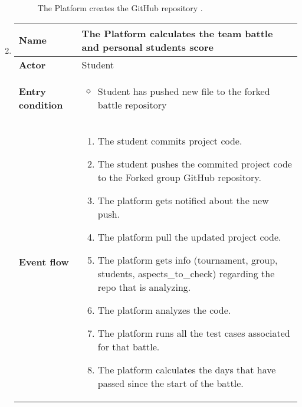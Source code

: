 \begin{enumerate}[label=\textbf{UC\arabic*}:,leftmargin=1.3cm]
          \begin{figure}[H]
              \centering
              \caption{The Platform creates the GitHub repository   .}
              \label{fig:Subscribe to tournament from notification}
          \end{figure}
          \pagebreak
    \item \textbf{}
          \begin{table}[H]
              \centering
              \begin{tabular}{|l|p{11.9cm}|}
                  \hline
                  \textbf{Name}            & The Platform calculates the team battle and personal students score                    \\\hline
                  \textbf{Actor}           & Student                                                                               \\\hline
                  \textbf{Entry condition} &
                  \begin{itemize}
                      \item Student has pushed new file to the forked battle repository
                  \end{itemize}                                                \\\hline
                  \textbf{Event flow}      &
                  \begin{enumerate}[label=\arabic*.]
                      \item The student commits project code.
                      \item The student pushes the commited project code to the Forked group GitHub repository.
                      \item The platform gets notified about the new push.
                      \item The platform pull the updated project code.
                      \item The platform gets info (tournament, group, students, aspects_to_check) regarding the repo that is analyzing.
                      \item The platform analyzes the code.
                      \item The platform runs all the test cases associated for that battle.
                      \item The platform calculates the days that have passed since the start of the battle.

\end{enumerate}
\end{tabular}
\end{table}
\end{enumerate}
